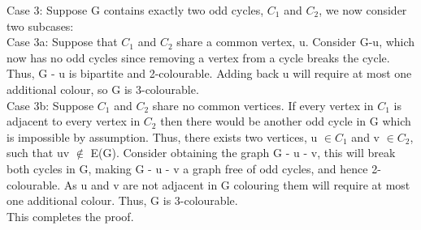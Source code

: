 \documentclass{article}
\begin{document}
\noindent
Case 3: Suppose G contains exactly two odd cycles, $C_1$ and $C_2$, we now consider
two subcases:\\

Case 3a: Suppose that $C_1$ and $C_2$ share a common vertex, u. Consider
G-u, which now has no odd cycles since removing a vertex from
a cycle breaks the cycle. Thus, G - u is bipartite and 2-colourable.
Adding back u will require at most one additional colour, so G is
3-colourable.\\

Case 3b: Suppose $C_1$ and $C_2$ share no common vertices. If every
vertex in $C_1$ is adjacent to every vertex in $C_2$ then there would be
another odd cycle in G which is impossible by assumption. Thus,
there exists two vertices, u $\in C_1$ and v $\in C_2$, such that uv $\notin$ E(G).
Consider obtaining the graph G - u - v, this will break both cycles
in G, making G - u - v a graph free of odd cycles, and hence
2-colourable. As u and v are not adjacent in G colouring them will
require at most one additional colour. Thus, G is 3-colourable.\\

\noindent
This completes the proof.
\end{document}
